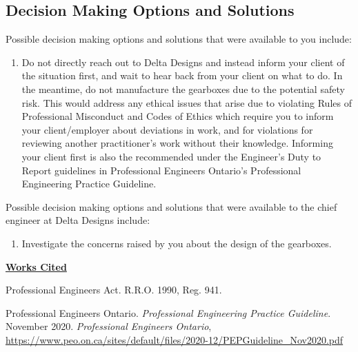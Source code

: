 \documentclass[12pt,letterpaper]{article}
\begin{document}
\subsection*{Decision Making Options and Solutions}
Possible decision making options and solutions that were available to you include:
\begin{enumerate}
	\item Do not directly reach out to Delta Designs and instead inform your client of the situation first, and wait to hear back from your client on what to do. In the meantime, do not manufacture the gearboxes due to the potential safety risk. This would address any ethical issues that arise due to violating Rules of Professional Misconduct and Codes of Ethics which require you to inform your client/employer about deviations in work, and for violations for reviewing another practitioner's work without their knowledge. Informing your client first is also the recommended under the Engineer's Duty to Report guidelines in Professional Engineers Ontario's Professional Engineering Practice Guideline.
\end{enumerate}
Possible decision making options and solutions that were available to the chief engineer at Delta Designs include:
\begin{enumerate}
	\item Investigate the concerns raised by you about the design of the gearboxes.
\end{enumerate}
\clearpage

\clearpage 
\noindent
\textbf{\underline{Works Cited}}

\begin{hangparas}{1em}{1}
Professional Engineers Act. R.R.O. 1990, Reg. 941.

Professional Engineers Ontario. \textit{Professional Engineering Practice Guideline}. November 2020. \textit{Professional Engineers Ontario}, \url{https://www.peo.on.ca/sites/default/files/2020-12/PEPGuideline_Nov2020.pdf}



\end{hangparas}
\end{document}
